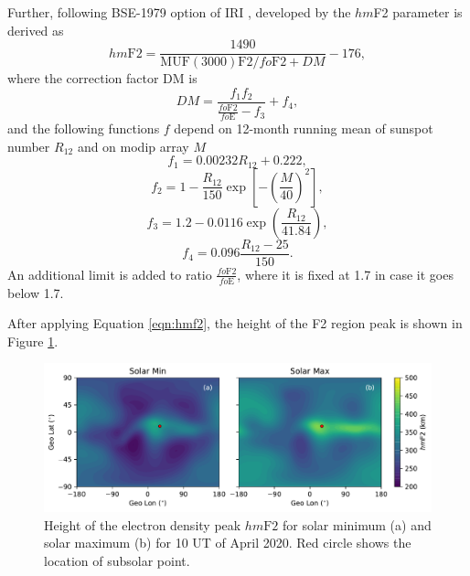 \documentclass[draft]{agujournal2019}
\begin{document}
Further, following BSE-1979 option of IRI \cite{Bil22}, developed by  the $hm$F2 parameter is derived as
\begin{equation}\label{eqn:hmf2}
hm\mathrm{F2}=\frac{1490}{\mathrm{MUF(3000)F2}/fo\mathrm{F2}+DM}-176,
\end{equation}
where the correction factor DM is 
\begin{equation}\label{eqn:DM}
DM=\frac{f_1 f_2}{\frac{fo\mathrm{F2}}{fo\mathrm{E}}-f_3}+f_4,
\end{equation}
and the following functions $f$ depend on 12-month running mean of sunspot number $R_{12}$ and on modip array $M$
\begin{equation}\label{eqn:f1}
f_1=0.00232R_{12}+0.222,
\end{equation}
\begin{equation}\label{eqn:f2}
f_2=1-\frac{R_{12}}{150}\exp\left[ -\left(\frac{M}{40}\right)^2\right],
\end{equation}
\begin{equation}\label{eqn:f3}
f_3=1.2-0.0116\exp\left(\frac{R_{12}}{41.84}\right),
\end{equation}
\begin{equation}\label{eqn:f4}
f_4=0.096\frac{R_{12}-25}{150}.
\end{equation}
An additional limit is added to ratio $\frac{fo\mathrm{F2}}{fo\mathrm{E}}$, where it is fixed at 1.7 in case it goes below 1.7. 

After applying Equation \ref{eqn:hmf2}, the height of the F2 region peak is shown in Figure \ref{fig:hmF2_min_max}. 
\begin{figure}[H]
  \includegraphics[scale=0.7]{PyIRI_hmF2_min_max.pdf}
  \caption{Height of the electron density peak $hm\mathrm{F2}$ for solar minimum (a) and solar maximum (b) for 10 UT of April 2020. Red circle shows the location of subsolar point.}
  \label{fig:hmF2_min_max}
\end{figure}

\end{document}
